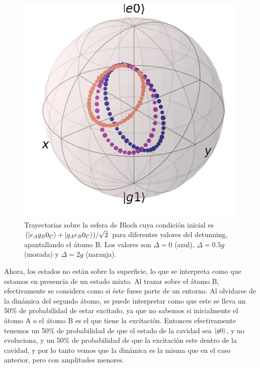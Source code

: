 \begin{figure}[H]
    \begin{minipage}[c]{0.5\textwidth}
        \includegraphics[width=\textwidth]{figuras/ch4/bloch eg0+ge0 bloch AC a=0 d=2.0 x=0.0 k=0.0 J=0.0 gamma=0.0 p=0.0.png}
    \end{minipage}
    \hfill
    \begin{minipage}[c]{0.3\textwidth}
        \caption{Trayectorias sobre la esfera de Bloch cuya condición inicial es $(\ket{e_Ag_B0_C}+\ket{g_Ae_B0_C})/\sqrt{2}$ para diferentes valores del detunning, apantallando el átomo B. Los valores son $\Delta=0$ (azul), $\Delta=0.5g$ (morada) y $\Delta=2g$ (naranja).}
        \label{fig4:bloch delta eg0 sim}
    \end{minipage}
\end{figure}
Ahora, los estados no están sobre la superficie, lo que se interpreta como que estamos en presencia de un estado mixto. Al trazar sobre el átomo B, efectivamente se considera como si éste fuese parte de un entorno. Al olvidarse de la dinámica del segundo átomo, se puede interpretar como que este se lleva un 50\% de probabilidad de estar excitado, ya que no sabemos si inicialmente el átomo A o el átomo B es el que tiene la excitación. Entonces efectivamente tenemos un 50\% de probabilidad de que el estado de la cavidad sea $\ket{g0}$, y no evoluciona, y un 50\% de probabilidad de que la excitación este dentro de la cavidad, y por lo tanto vemos que la dinámica es la misma que en el caso anterior, pero con amplitudes menores.

